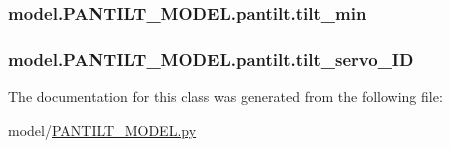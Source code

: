 \subsubsection[{tilt\+\_\+min}]{\setlength{\rightskip}{0pt plus 5cm}model.\+P\+A\+N\+T\+I\+L\+T\+\_\+\+M\+O\+D\+E\+L.\+pantilt.\+tilt\+\_\+min}\label{classmodel_1_1PANTILT__MODEL_1_1pantilt_abed248a0b87a8f060c65e185125cea09}
\hypertarget{classmodel_1_1PANTILT__MODEL_1_1pantilt_ab0d3687530a05750330e616d8cd902b9}{}
\subsubsection[{tilt\+\_\+servo\+\_\+\+I\+D}]{\setlength{\rightskip}{0pt plus 5cm}model.\+P\+A\+N\+T\+I\+L\+T\+\_\+\+M\+O\+D\+E\+L.\+pantilt.\+tilt\+\_\+servo\+\_\+\+I\+D}\label{classmodel_1_1PANTILT__MODEL_1_1pantilt_ab0d3687530a05750330e616d8cd902b9}


The documentation for this class was generated from the following file\+:\begin{DoxyCompactItemize}
\item 
model/\hyperlink{PANTILT__MODEL_8py}{P\+A\+N\+T\+I\+L\+T\+\_\+\+M\+O\+D\+E\+L.\+py}\end{DoxyCompactItemize}
